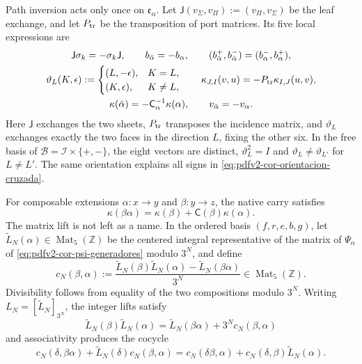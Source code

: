 Path inversion acts only once on
\(\mathfrak e_\alpha\). Let
\(\mathsf J(v_\Sigma,v_\Pi):=(v_\Pi,v_\Sigma)\) be the leaf exchange,
and let \(P_{\rm tr}\) be the transposition of port matrices. Its five
local expressions are
\begin{equation}
\label{eq:pdfv2-cor-orientacion-cruzada}
 \begin{gathered}
 \mathsf J\sigma_k=-\sigma_k\mathsf J,
 \qquad b_{\bar\alpha}=-b_\alpha,
 \qquad (b_{\bar\alpha}^+,b_{\bar\alpha}^-)
       =(b_\alpha^-,b_\alpha^+),\\
 \vartheta_L(K,\epsilon):=
 \begin{cases}
  (L,-\epsilon),&K=L,\\
  (K,\epsilon),&K\neq L,
 \end{cases}
 \qquad
 \kappa_{J,I}(v,u)=-P_{\rm tr}\kappa_{I,J}(u,v),\\
 \kappa(\bar\alpha)
 =-\mathsf C_\alpha^{-1}\kappa(\alpha),
 \qquad v_{\bar\alpha}=-v_\alpha.
 \end{gathered}
\end{equation}
Here \(\mathsf J\) exchanges the two sheets, \(P_{\rm tr}\) transposes the incidence matrix, and \(\vartheta_L\) exchanges exactly the two faces in the direction \(L\), fixing the other six. In the free basis of \(\mathscr B=\mathscr I\times\{+,-\}\), the eight vectors are distinct, \(\vartheta_L^2=I\) and \(\vartheta_L\neq\vartheta_{L'}\) for \(L\neq L'\). The same orientation explains all signs in \eqref{eq:pdfv2-cor-orientacion-cruzada}.

For composable extensions \(\alpha:x\to y\) and \(\beta:y\to z\), the
native carry satisfies
\begin{equation}
\label{eq:pdfv2-cor-carry-nativo}
 \kappa(\beta\alpha)=
 \kappa(\beta)+\mathsf C(\beta)\kappa(\alpha).
\end{equation}
The matrix lift is not left as a name. In the ordered basis
\((f,r,e,b,g)\), let
\(\widetilde L_N(\alpha)\in\operatorname{Mat}_5(\mathbb Z)\) be the
centered integral representative of the matrix of
\(\Psi_\alpha\) of \eqref{eq:pdfv2-cor-psi-generadores} modulo \(3^N\), and
define
\begin{equation}
\label{eq:pdfv2-cor-carry-matricial-def}
 c_N(\beta,\alpha):=
 \frac{\widetilde L_N(\beta)\widetilde L_N(\alpha)
       -\widetilde L_N(\beta\alpha)}{3^N}
 \in\operatorname{Mat}_5(\mathbb Z).
\end{equation}
Divisibility follows from equality of the two compositions modulo
\(3^N\). Writing \(L_N=[\widetilde L_N]_{3^N}\), the integer lifts
satisfy
\begin{equation}
\label{eq:pdfv2-cor-carry-matricial}
 \widetilde L_N(\beta)\widetilde L_N(\alpha)
 =\widetilde L_N(\beta\alpha)+3^Nc_N(\beta,\alpha)
\end{equation}
and associativity produces the cocycle
\begin{equation}
\label{eq:pdfv2-cor-cociclo-matricial}
 c_N(\delta,\beta\alpha)+\widetilde L_N(\delta)c_N(\beta,\alpha)
 =c_N(\delta\beta,\alpha)
  +c_N(\delta,\beta)\widetilde L_N(\alpha).
\end{equation}

